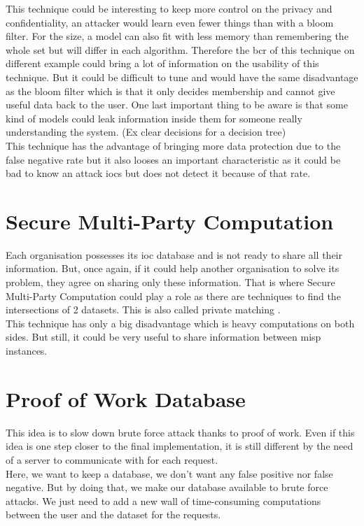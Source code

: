 \documentclass{eplmastersthesis}
\begin{document}
This technique could be interesting to keep more control on the privacy and confidentiality, an attacker would learn even fewer things than with a bloom filter.
For the size, a model can also fit with less memory than remembering the whole set but will differ in each algorithm.
Therefore the \gls{bcr} of this technique on different example could bring a lot of information on the usability of this technique. But it could be difficult to tune and would have the same disadvantage as the bloom filter which is that it only decides membership and cannot give useful data back to the user. One last important thing to be aware is that some kind of models could leak information inside them for someone really understanding the system. (Ex clear decisions for a decision tree)\\

This technique has the advantage of bringing more data protection due to the false negative rate but it also looses an important characteristic as it could be bad to know an attack \gls{ioc}s but does not detect it because of that rate.

\section{Secure Multi-Party Computation}
Each organisation possesses its \gls{ioc} database and is not ready to share all their information. But, once again, if it could help another organisation to solve its problem, they agree on sharing only these information.
That is where Secure Multi-Party Computation could play a role as there are techniques to find the intersections of 2 datasets. This is also called private matching \cite{agrawal2003information, li2005private}.\\

This technique has only a big disadvantage which is heavy computations on both sides. But still, it could be very useful to share information between \gls{misp} instances.

\section{Proof of Work Database}
This idea is to slow down brute force attack thanks to proof of work. Even if this idea is one step closer to the final implementation, it is still different by the need of a server to communicate with for each request.\\

Here, we want to keep a database, we don't want any false positive nor false negative. But by doing that, we make our database available to brute force attacks.
We just need to add a new wall of time-consuming computations between the user and the dataset for the requests.\\
\end{document}

